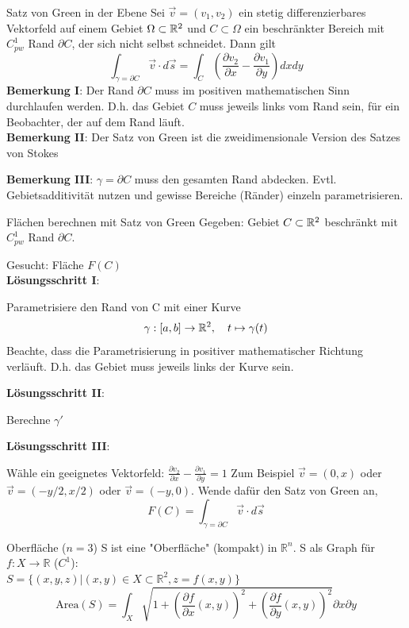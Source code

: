 \begin{Satz}{Satz von Green in der Ebene}{}
	Sei $\vec{v} = (v_1, v_2)$ ein stetig differenzierbares Vektorfeld auf einem Gebiet $\Omega \subset \mathbb{R}^2$ und $C \subset \Omega$ ein beschränkter Bereich mit $C^1_{pw}$ Rand $\partial C$, der sich nicht selbst schneidet. Dann gilt
	\[
		\int_{\gamma=\partial C} \vec{v} \cdot d\vec{s} = 
		\int_C \left(\frac{\partial v_2}{\partial x} - \frac{\partial v_1}{\partial y}\right) dxdy
	\]
	\textbf{Bemerkung I}: Der Rand $\partial C$ muss im positiven mathematischen Sinn durchlaufen werden. D.h. das Gebiet $C$ muss jeweils links vom Rand sein, für ein Beobachter, der auf dem Rand läuft.\\
	
	\textbf{Bemerkung II}: Der Satz von Green ist die zweidimensionale Version des Satzes von Stokes
	
	\textbf{Bemerkung III}: $\gamma=\partial C$ muss den gesamten Rand abdecken. Evtl. Gebietsadditivität nutzen und gewisse Bereiche (Ränder) einzeln parametrisieren.
\end{Satz}

\begin{Rezept}[label=GreenFlaechen]{Flächen berechnen mit Satz von Green}{}
	Gegeben: Gebiet $C \subset \mathbb{R}^2$ beschränkt mit $C^1_{pw}$ Rand $\partial C$.
	
	Gesucht: Fläche $F(C)$\\
	
	\textbf{Lösungsschritt I}:
	
	Parametrisiere den Rand von C mit einer Kurve
	\[
  		\gamma:[a, b] \to \mathbb{R}^2,\quad t \mapsto \gamma(t)
	\]
	Beachte, dass die Parametrisierung in positiver mathematischer Richtung verläuft. D.h. das Gebiet muss jeweils links der Kurve sein.
	
	\textbf{Lösungsschritt II}:
	
	Berechne $\gamma'$

	\textbf{Lösungsschritt III}:
	
	Wähle ein geeignetes Vektorfeld:
	$\frac{\partial v_2}{\partial x} -\frac{\partial v_1}{\partial y} = 1$ 
	Zum Beispiel $\vec v = (0, x)$ oder $\vec v = (-y/2, x/2)$ oder $\vec v = (-y, 0)$.
	Wende dafür den Satz von Green an,
	\[
  		F(C) =
  		\int_{\gamma=\partial C} \vec{v} \cdot d\vec{s}
	\]
\end{Rezept}

\begin{Satz}{Oberfläche}{}
($n=3$) S ist eine "Oberfläche" (kompakt) in $\mathbb{R}^n$. S als Graph für $f: X \rightarrow \mathbb{R}$ ($C^1$): \\
$S=\{(x,y,z) | (x,y) \in X \subset \mathbb{R}^2, z = f(x,y)\}$
\[
\text{Area}(S) = \int_X \sqrt{1+ (\frac{\partial f}{\partial x}(x,y))^2 + (\frac{\partial f}{\partial y}(x,y))^2} \partial x \partial y
\]
\end{Satz}

